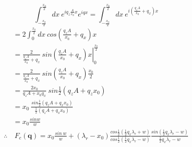\documentclass[letterpage]{article}
\begin{document}
\begin{equation}
  \int_{-\frac{x_0}{2}}^{\frac{x_0}{2}} dx \: e^{iq_z \frac{A}{x_0}x}
  e^{iqx} = \int_{-\frac{x_0}{2}}^{\frac{x_0}{2}} dx \: 
  e^{i\left(\frac{q_zA}{x_0} + q_x \right)x}
\end{equation}
\begin{align}
  &= 2 \int_{0}^{\frac{x_0}{2}} dx \:cos \left(\frac{q_zA}{x_0} + q_x \right)x\\
  &= \frac{2}{\frac{q_zA}{x_0} + q_x} \: 
  sin \left. \left(\frac{q_zA}{x_0} + q_x \right) x \right|_{0}^{\frac{x_0}{2}}\\
  &= \frac{2}{\frac{q_zA}{x_0}+q_x} \: sin \left(\frac{q_zA}{x_0}+q_x \right)
  \frac{x_0}{2}\\
  &= \frac{2x_0}{q_zA + x_0 q_x} \: sin \frac{1}{2} (q_zA + q_z x_0)\\
  &= x_0 \: \frac{sin\frac{1}{2}\left(q_zA + q_x x_0 \right)}
  {\frac{1}{2}\left(q_zA + q_x x_0 \right)}\\
  &= x_0 \frac{sinw}{w}\\
  \therefore & \: F_c(\textbf{q}) = x_0 \frac{sin \:w}{w} + (\lambda_r - x_0)
  \frac{cos\frac{1}{2}\left(\frac{1}{2} q_x \lambda_r + w\right)}
  {cos\frac{1}{2} \left(\frac{1}{2}q_x \lambda_r - w \right)}
  \frac{sin\left(\frac{1}{2}q_x \lambda_r - w \right)}{\frac{1}{2}q_x \lambda_r
  - w}
\end{align}
\end{document}
